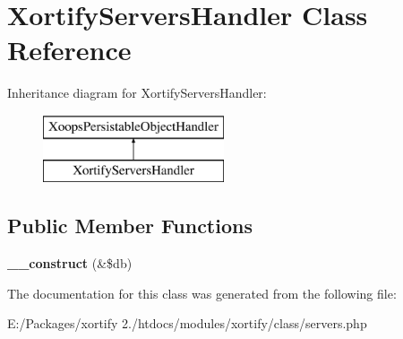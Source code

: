 \hypertarget{class_xortify_servers_handler}{\section{Xortify\-Servers\-Handler Class Reference}
\label{class_xortify_servers_handler}
}
Inheritance diagram for Xortify\-Servers\-Handler\-:\begin{figure}[H]
\begin{center}
\leavevmode
\includegraphics[height=2.000000cm]{class_xortify_servers_handler}
\end{center}
\end{figure}
\subsection*{Public Member Functions}
\begin{DoxyCompactItemize}
\item 
\hypertarget{class_xortify_servers_handler_af25e58851525e81f176fabbfda8acd4e}{{\bfseries \-\_\-\-\_\-construct} (\&\$db)}\label{class_xortify_servers_handler_af25e58851525e81f176fabbfda8acd4e}

\end{DoxyCompactItemize}


The documentation for this class was generated from the following file\-:\begin{DoxyCompactItemize}
\item 
E\-:/\-Packages/xortify 2./htdocs/modules/xortify/class/servers.\-php\end{DoxyCompactItemize}
